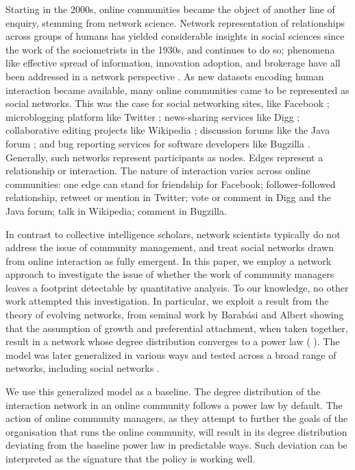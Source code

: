 \documentclass{article}
\begin{document}
Starting in the 2000s, online communities became the object of another line of enquiry, stemming from network science. Network representation of relationships across groups of humans has yielded considerable insights in social sciences since the work of the sociometrists in the 1930s, and continues to do so; phenomena like effective spread of information, innovation adoption, and brokerage have all been addressed in a network perspective \cite{borgatti2009network, burt2009structural}. As new datasets encoding human interaction became available, many online communities came to be represented as social networks. This was the case for social networking sites, like Facebook \cite{lewis2008tastes, nick2013toward}; microblogging platform like Twitter \cite{kunegis2013preferential, java2007we, hodas2014simple}; news-sharing services like Digg \cite{hodas2014simple}; collaborative editing projects like Wikipedia \cite{laniado2011wikipedians}; discussion forums like the Java forum \cite{zhang2007expertise}; and bug reporting services for software developers like Bugzilla \cite{zanetti2012quantitative}. Generally, such networks represent participants as nodes. Edges represent a relationship or interaction. The nature of interaction varies across online communities: one edge can stand for friendship for Facebook; follower-followed relationship, retweet or mention in Twitter; vote or comment in Digg and the Java forum; talk in Wikipedia; comment in Bugzilla. 

In contrast to collective intelligence scholars, network scientists typically do not address the issue of community management, and treat social networks drawn from online interaction as fully emergent. In this paper, we employ a network approach to investigate the issue of whether the work of community managers leaves a footprint detectable by quantitative analysis. To our knowledge, no other work attempted this investigation.
In particular, we exploit a result from the theory of evolving networks, from seminal work by Barab\'asi and Albert \cite{barabasi1999emergence} showing that the assumption of growth and preferential attachment, when taken together, result in a network whose degree distribution converges to a power law ( \cite{barabasi2005origin, barabasi1999mean}). The model was later generalized in various ways and tested across a broad range of networks, including social networks 
\cite{dorogovtsev2002evolution}. 

We use this generalized model as a baseline. The degree distribution of the interaction network in an online community follows a power law by default. The action of online community managers, as they attempt to further the goals of the organisation that runs the online community, will result in its degree distribution deviating from the baseline power law in predictable ways. Such deviation can be interpreted as the signature that the policy is working well. 
\end{document}
